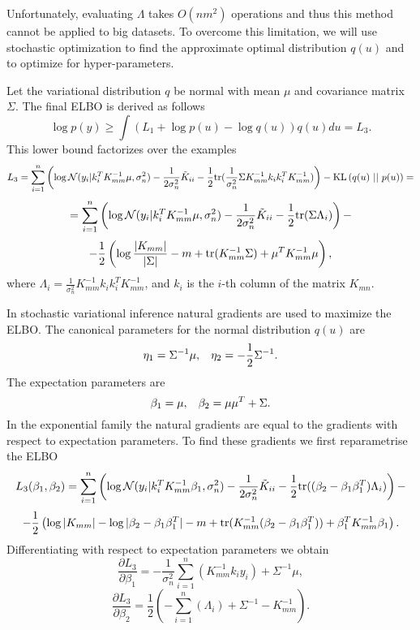 \documentclass[12pt]{article}
\begin{document}
		Unfortunately, evaluating $\Lambda$ takes $O(n m^2)$ operations and thus this method cannot be applied to big datasets. To overcome this limitation, we will use stochastic optimization to find the approximate optimal distribution $q(u)$ and to optimize for hyper-parameters. 
		
		Let the variational distribution $q$ be normal with mean $\mu$ and covariance matrix $\Sigma$. The final ELBO is derived as follows
		$$\log p(y) \ge \int \left( L_1 + \log p(u) - \log q(u)\right) q(u) du = L_3.$$
		This lower bound factorizes over the examples 
		$$L_3 = \sum_{i = 1}^{n} \left( \log \mathcal{N}(y_i | k_i^T K_{mm}^{-1} \mu, \sigma_n^2) - \frac 1 {2 \sigma_n^2} \tilde K_{ii} - \frac 1 2 \mbox{tr} (\frac 1 {\sigma_n^2} \Sigma K_{mm}^{-1} k_i k_i^T K_{mm}^{-1}) \right) - \mbox{KL}\left(q(u)\mbox{ || }p(u)\right) = $$
		$$ = \sum_{i = 1}^{n} \left( \log \mathcal{N}(y_i | k_i^T K_{mm}^{-1} \mu, \sigma_n^2) - \frac 1 {2 \sigma_n^2} \tilde K_{ii} - \frac 1 2 \mbox{tr} (\Sigma \Lambda_i) \right) - $$
		$$ -\frac 1 2 \left (\log \frac {|K_{mm}|} {|\Sigma|} - m + \mbox{tr}(K_{mm}^{-1} \Sigma) + \mu^T K_{mm}^{-1} \mu \right),$$
		where $\Lambda_i = \frac 1 {\sigma_n^2} K_{mm}^{-1} k_i k_i^T K_{mm}^{-1}$, and $k_i$ is the $i$-th column of the matrix $K_{mn}$.
		
		In stochastic variational inference natural gradients are used to maximize the ELBO. The canonical parameters for the normal distribution $q(u)$ are
		$$\eta_1 = \Sigma^{-1} \mu, \hspace{0.3cm}\eta_2 = - \frac 1 2 \Sigma^{-1}.$$
		The expectation parameters are
		$$\beta_1 = \mu, \hspace{0.3cm}\beta_2 = \mu \mu^T + \Sigma.$$
		In the exponential family the natural gradients are equal to the gradients with respect to expectation parameters. To find these gradients we first reparametrise the ELBO
		$$L_3(\beta_1, \beta_2) =  \sum_{i = 1}^{n} \left( \log \mathcal{N}(y_i | k_i^T K_{mm}^{-1} \beta_1, \sigma_n^2) - \frac 1 {2 \sigma_n^2} \tilde K_{ii} - \frac 1 2 \mbox{tr} ((\beta_2 - \beta_1 \beta_1^T) \Lambda_i) \right) - $$
		$$ -\frac 1 2 \left (\log |K_{mm}| - \log |\beta_2 - \beta_1 \beta_1^T| - m + \mbox{tr}(K_{mm}^{-1} (\beta_2 - \beta_1 \beta_1^T)) + \beta_1^T K_{mm}^{-1} \beta_1 \right).$$
		Differentiating with respect to expectation parameters we obtain
		\begin{equation}
			\label{natgrad1}
			\frac{\partial L_3} {\partial\beta_1} =  -\frac 1 {\sigma_n^2}  \sum_{i = 1}^{n} \left(K_{mm}^{-1} k_i y_i \right) + \Sigma^{-1} \mu,
		\end{equation}
		\begin{equation}
			\label{natgrad2}
			\frac{\partial L_3} {\partial\beta_2} = \frac 1 {2} \left(-\sum_{i = 1}^{n} (\Lambda_i) + \Sigma^{-1}  - K_{mm}^{-1}\right).
		\end{equation}
		
\end{document}

